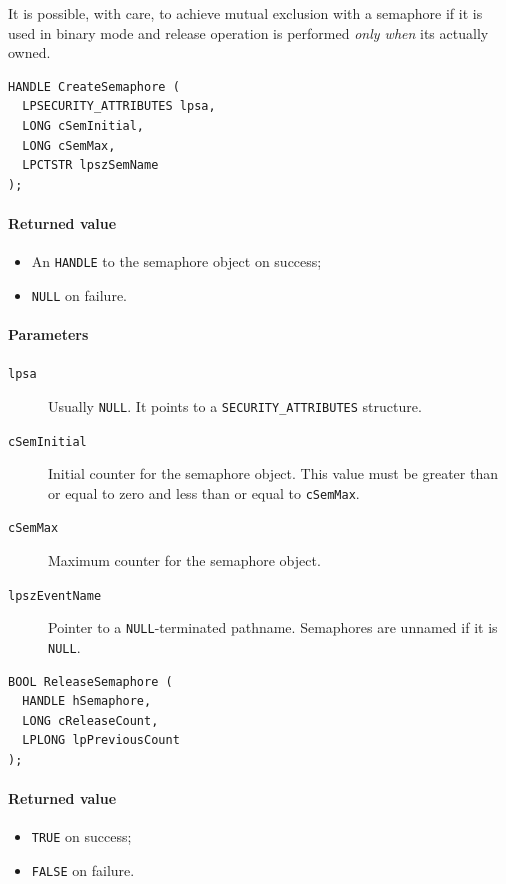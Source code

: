It is possible, with care, to achieve mutual exclusion with a semaphore if it is used in binary mode and release operation is performed \emph{only when} its actually owned.

\begin{verbatim}
HANDLE CreateSemaphore (
  LPSECURITY_ATTRIBUTES lpsa,
  LONG cSemInitial,
  LONG cSemMax,
  LPCTSTR lpszSemName
);
\end{verbatim}

\paragraph{Returned value}
\begin{itemize}
\item An \texttt{HANDLE} to the semaphore object on success;
\item \texttt{NULL} on failure.
\end{itemize}

\paragraph{Parameters}
\begin{description}
\item [\texttt{lpsa}] Usually \texttt{NULL}. It points to a \texttt{SECURITY\_ATTRIBUTES} structure.
\item [\texttt{cSemInitial}] Initial counter for the semaphore object. This value must be greater than or equal to zero and less than or equal to \texttt{cSemMax}.
\item [\texttt{cSemMax}] Maximum counter for the semaphore object.
\item [\texttt{lpszEventName}] Pointer to a \texttt{NULL}-terminated pathname. Semaphores are unnamed if it is \texttt{NULL}.
\end{description}

\begin{verbatim}
BOOL ReleaseSemaphore (
  HANDLE hSemaphore,
  LONG cReleaseCount,
  LPLONG lpPreviousCount
);
\end{verbatim}

\paragraph{Returned value}
\begin{itemize}
\item \texttt{TRUE} on success;
\item \texttt{FALSE} on failure.
\end{itemize}

